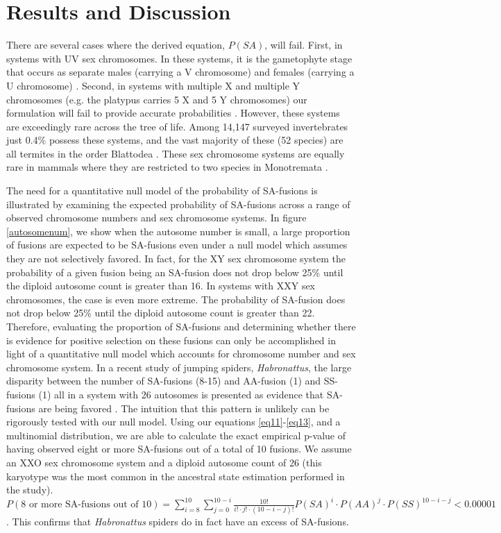 \documentclass[12pt]{article}
\begin{document}
\section{Results and Discussion}

There are several cases where the derived equation, $P(SA)$, will fail.
First, in systems with UV sex chromosomes. 
In these systems, it is the gametophyte stage that occurs as separate males (carrying a V chromosome) and females (carrying a U chromosome) \citep{bachtrog2014sex}.
Second, in systems with multiple X and multiple Y chromosomes (e.g. the platypus carries 5 X and 5 Y chromosomes) our formulation will fail to provide accurate probabilities \citep{hsu2013}.
However, these systems are exceedingly rare across the tree of life.
Among 14,147 surveyed invertebrates just 0.4\% possess these systems, and the vast majority of these (52 species) are all termites in the order Blattodea \citep{blackmon2017}. 
These sex chromosome systems are equally rare in mammals where they are restricted to two species in Monotremata \citep{ashman2014tree}.

The need for a quantitative null model of the probability of SA-fusions is illustrated by examining the expected probability of SA-fusions across a range of observed chromosome numbers and sex chromosome systems.
In figure \ref{autosomenum}, we show when the autosome number is small, a large proportion of fusions are expected to be SA-fusions even under a null model which assumes they are not selectively favored. 
In fact, for the XY sex chromosome system the probability of a given fusion being an SA-fusion does not drop below 25\% until the diploid autosome count is greater than 16. 
In systems with XXY sex chromosomes, the case is even more extreme. The probability of SA-fusion does not drop below 25\% until the diploid autosome count is greater than 22.
Therefore, evaluating the proportion of SA-fusions and determining whether there is evidence for positive selection on these fusions can only be accomplished in light of a quantitative null model which accounts for chromosome number and sex chromosome system.
In a recent study of jumping spiders, \textit{Habronattus}, the large disparity between the number of SA-fusions (8-15) and AA-fusion (1) and SS-fusions (1) all in a system with 26 autosomes is presented as evidence that SA-fusions are being favored \citep{maddison2013}. 
The intuition that this pattern is unlikely can be rigorously tested with our null model.
Using our equations \ref{eq11}-\ref{eq13}, and a multinomial distribution, we are able to calculate the exact empirical p-value of having observed eight or more SA-fusions out of a total of 10 fusions.
We assume an XXO sex chromosome system and a diploid autosome count of 26 (this karyotype was the most common in the ancestral state estimation performed in the study).
$P(8 \mbox{ or more SA-fusions out of } 10)= 
\sum\limits_{i=8}^{10} \sum\limits_{j=0}^{10-i} \frac{10!}{i! \cdot j! \cdot (10-i-j)!} P(SA)^i \cdot P(AA)^j \cdot P(SS)^{10-i-j} < 0.00001$. 
This confirms that \textit{Habronattus} spiders do in fact have an excess of SA-fusions.
\end{document}
